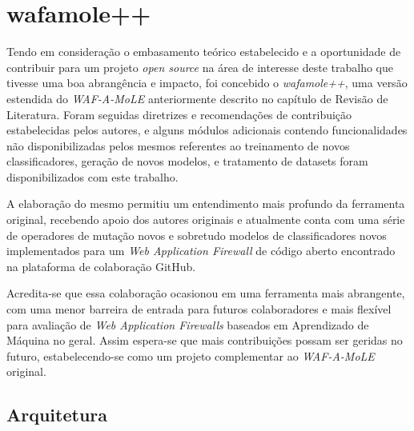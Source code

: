 \chapter{wafamole++}
\label{chp:capitulo4}

Tendo em consideração o embasamento teórico estabelecido e a oportunidade de contribuir para um projeto \textit{open source} na área de interesse deste trabalho que tivesse uma boa abrangência e impacto, foi concebido o \textit{wafamole++}, uma versão estendida do \textit{WAF-A-MoLE} anteriormente descrito no capítulo de Revisão de Literatura. Foram seguidas diretrizes e recomendações de contribuição estabelecidas pelos autores, e alguns módulos adicionais contendo funcionalidades não disponibilizadas pelos mesmos referentes ao treinamento de novos classificadores, geração de novos modelos, e tratamento de datasets foram disponibilizados com este trabalho.

A elaboração do mesmo permitiu um entendimento mais profundo da ferramenta original, recebendo apoio dos autores originais e atualmente conta com uma série de operadores de mutação novos e sobretudo modelos de classificadores novos implementados para um \textit{Web Application Firewall} de código aberto encontrado na plataforma de colaboração GitHub.

Acredita-se que essa colaboração ocasionou em uma ferramenta mais abrangente, com uma menor barreira de entrada para futuros colaboradores e mais flexível para avaliação de \textit{Web Application Firewalls} baseados em Aprendizado de Máquina no geral. Assim espera-se que mais contribuições possam ser geridas no futuro, estabelecendo-se como um projeto complementar ao \textit{WAF-A-MoLE} original.


\section{Arquitetura}

